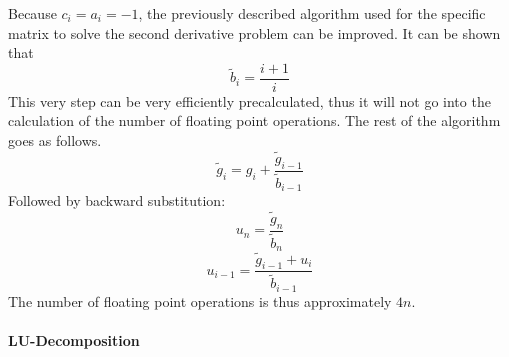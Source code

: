 \documentclass[10pt,a4paper]{article}
\begin{document}
Because $c_i=a_i=-1$, the previously described algorithm used for the specific matrix  to solve the second derivative problem can be improved. It can be shown that 
$$\tilde{b}_i=\frac{i+1}{i}$$
This very step can be very efficiently precalculated, thus it will not go into the calculation of the number of floating point operations. The rest of the algorithm goes as follows.
$$\tilde{g}_i=g_i+\frac{\tilde{g}_{i-1}}{\tilde{b}_{i-1}} $$
Followed by backward substitution:
$$u_n = \frac{\tilde{g}_n}{\tilde{b}_n}$$
$$u_{i-1} = \frac{\tilde{g}_{i-1}+u_i}{\tilde{b}_{i-1}}$$
The number of floating point operations is thus approximately $4n$.\\

\paragraph{LU-Decomposition}
\end{document}

